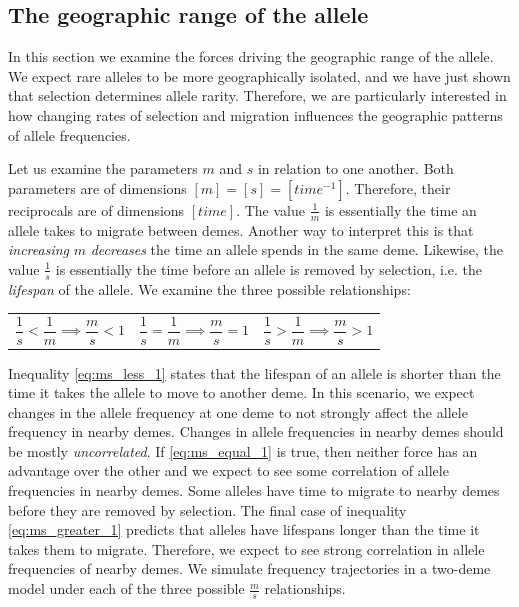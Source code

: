 \newpage
\subsection{The geographic range of the allele}
In this section we examine the forces driving the geographic range of the allele. We expect rare alleles to be more geographically isolated, and we have just shown that selection determines allele rarity. Therefore, we are particularly interested in how changing rates of selection and migration influences the geographic patterns of allele frequencies. 


Let us examine the parameters $m$ and $s$ in relation to one another. Both parameters are of dimensions $[m] = [s] = [time^{-1}]$. Therefore, their reciprocals are of dimensions $[time]$. The value $\frac{1}{m}$ is essentially the time an allele takes to migrate between demes. Another way to interpret this is that \textit{increasing} $m$ \textit{decreases} the time an allele spends in the same deme. Likewise, the value $\frac{1}{s}$ is essentially the time before an allele is removed by selection, i.e. the \textit{lifespan} of the allele. We examine the three possible relationships:

\noindent\begin{tabularx}{\textwidth}{@{}XXX@{}}
  \begin{equation} 
           \frac{1}{s} < \frac{1}{m}
    \implies \frac{m}{s} < 1 
    \label{eq:ms_less_1}
  \end{equation} &
  \begin{equation}
           \frac{1}{s} = \frac{1}{m}
    \implies \frac{m}{s} = 1 
    \label{eq:ms_equal_1}
  \end{equation} &
  \begin{equation}
           \frac{1}{s} > \frac{1}{m}
    \implies \frac{m}{s} > 1 
    \label{eq:ms_greater_1}
  \end{equation}
\end{tabularx}

Inequality \ref{eq:ms_less_1} states that the lifespan of an allele is shorter than the time it takes the allele to move to another deme. In this scenario, we expect changes in the allele frequency at one deme to not strongly affect the allele frequency in nearby demes. Changes in allele frequencies in nearby demes should be mostly \textit{uncorrelated}. If \ref{eq:ms_equal_1} is true, then neither force has an advantage over the other and we expect to see some correlation of allele frequencies in nearby demes. Some alleles have time to migrate to nearby demes before they are removed by selection. The final case of inequality \ref{eq:ms_greater_1} predicts that alleles have lifespans longer than the time it takes them to migrate. Therefore, we expect to see strong correlation in allele frequencies of nearby demes. We simulate frequency trajectories in a two-deme model under each of the three possible $\frac{m}{s}$ relationships.


